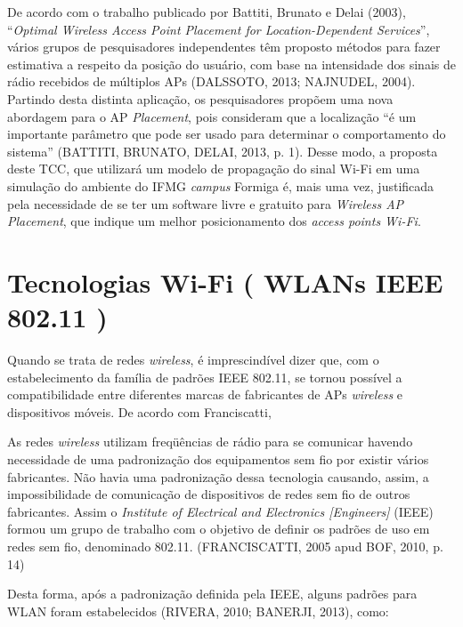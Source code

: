 \documentclass[
	12pt,				%
	openright,			%
	twoside,			%
	a4paper,			%
	english,			%
	french,				%
	spanish,			%
	brazil				%
	]{abntex2}
\begin{document}
De acordo com o trabalho publicado por Battiti, Brunato e Delai (2003), “\textit{Optimal Wireless Access Point Placement for Location-Dependent Services}”, vários grupos de pesquisadores independentes têm proposto métodos para fazer estimativa a respeito da posição do usuário, com base na intensidade dos sinais de rádio recebidos de múltiplos APs (DALSSOTO, 2013; NAJNUDEL, 2004). Partindo desta distinta aplicação, os pesquisadores propõem uma nova abordagem para o AP \textit{Placement}, pois consideram que a localização “é um importante parâmetro que pode ser usado para determinar o comportamento do sistema” (BATTITI, BRUNATO, DELAI, 2013, p. 1). Desse modo, a proposta deste TCC, que utilizará um modelo de propagação do sinal Wi-Fi em uma simulação do ambiente do IFMG \textit{campus} Formiga é, mais uma vez, justificada pela necessidade de se ter um software livre e gratuito para \textit{Wireless AP Placement}, que indique um melhor posicionamento dos \textit{access points Wi-Fi}.

\section[Tecnologias Wi-Fi ( WLANs IEEE 802.11 )]{Tecnologias Wi-Fi ( WLANs IEEE 802.11 )}

Quando se trata de redes \textit{wireless}, é imprescindível dizer que, com o estabelecimento da família de padrões IEEE 802.11, se tornou possível a compatibilidade entre diferentes marcas de fabricantes de APs \textit{wireless} e dispositivos móveis. De acordo com Franciscatti,

\begin{citacao}
	As redes \textit{wireless} utilizam freqüências de rádio para se comunicar havendo necessidade de uma padronização dos equipamentos sem fio por existir vários fabricantes. Não havia uma padronização dessa tecnologia causando, assim, a impossibilidade de comunicação de dispositivos de redes sem fio de outros fabricantes. Assim o \textit{Institute of Electrical and Electronics [Engineers]} (IEEE) formou um grupo de trabalho com o objetivo de definir os padrões de uso em redes sem fio, denominado 802.11. (FRANCISCATTI, 2005 apud BOF, 2010, p. 14)
\end{citacao}

Desta forma, após a padronização definida pela IEEE, alguns padrões para WLAN foram estabelecidos (RIVERA, 2010; BANERJI, 2013), como:
\end{document}
